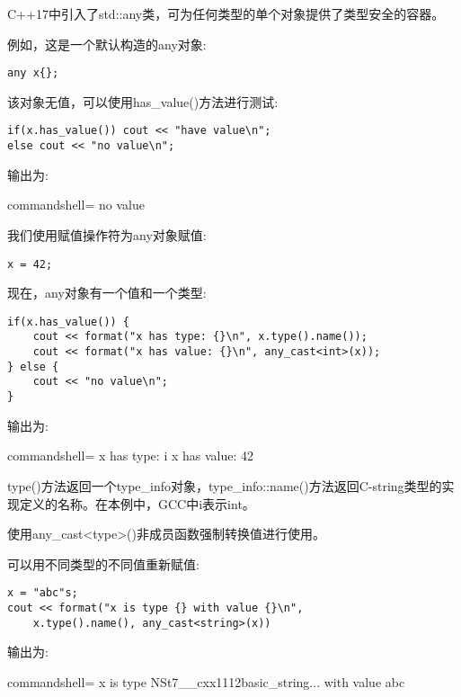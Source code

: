 
C++17中引入了std::any类，可为任何类型的单个对象提供了类型安全的容器。

例如，这是一个默认构造的any对象:

\begin{lstlisting}[style=styleCXX]
any x{};
\end{lstlisting}

该对象无值，可以使用has\_value()方法进行测试:

\begin{lstlisting}[style=styleCXX]
if(x.has_value()) cout << "have value\n";
else cout << "no value\n";
\end{lstlisting}

输出为:

\begin{tcblisting}{commandshell={}}
no value
\end{tcblisting}

我们使用赋值操作符为any对象赋值:

\begin{lstlisting}[style=styleCXX]
x = 42;
\end{lstlisting}

现在，any对象有一个值和一个类型:

\begin{lstlisting}[style=styleCXX]
if(x.has_value()) {
	cout << format("x has type: {}\n", x.type().name());
	cout << format("x has value: {}\n", any_cast<int>(x));
} else {
	cout << "no value\n";
}
\end{lstlisting}

输出为:

\begin{tcblisting}{commandshell={}}
x has type: i
x has value: 42
\end{tcblisting}

type()方法返回一个type\_info对象，type\_info::name()方法返回C-string类型的实现定义的名称。在本例中，GCC中i表示int。

使用any\_cast<type>()非成员函数强制转换值进行使用。

可以用不同类型的不同值重新赋值:

\begin{lstlisting}[style=styleCXX]
x = "abc"s;
cout << format("x is type {} with value {}\n",
	x.type().name(), any_cast<string>(x))
\end{lstlisting}

输出为:

\begin{tcblisting}{commandshell={}}
x is type NSt7__cxx1112basic_string... with value abc
\end{tcblisting}

